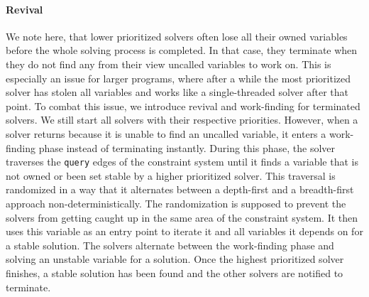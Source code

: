     \paragraph{Revival} We note here, that lower prioritized solvers often lose all their owned variables before the whole solving process is completed. In that case, they terminate when they do not find any from their view uncalled variables to work on. This is especially an issue for larger programs, where after a while the most prioritized solver has stolen all variables and works like a single-threaded solver after that point. To combat this issue, we introduce revival and work-finding for terminated solvers.
    We still start all solvers with their respective priorities. However, when a solver returns because it is unable to find an uncalled variable, it enters a work-finding phase instead of terminating instantly. During this phase, the solver traverses the \texttt{query} edges of the constraint system until it finds a variable that is not owned or been set stable by a higher prioritized solver. This traversal is randomized in a way that it alternates between a depth-first and a breadth-first approach non-deterministically. The randomization is supposed to prevent the solvers from getting caught up in the same area of the constraint system. It then uses this variable as an entry point to iterate it and all variables it depends on for a stable solution. The solvers alternate between the work-finding phase and solving an unstable variable for a solution. Once the highest prioritized solver finishes, a stable solution has been found and the other solvers are notified to terminate.

